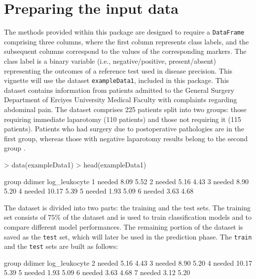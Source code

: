 \documentclass[10pt]{article}
\newcommand{\Rclass}[1]{\texttt{#1}}
\begin{document}
\section{Preparing the input data}
The methods provided within this package are designed to require a \Rclass{DataFrame} comprising three columns, where the first column represents class labels, and the subsequent columns correspond to the values of the corresponding markers. The class label is a binary variable (i.e., negative/positive, present/absent) representing the outcomes of a reference test used in disease precision. 
This vignette will use the dataset \texttt{exampleData1}, included in this package. This dataset contains information from patients admitted to the General Surgery Department of Erciyes University Medical Faculty with complaints regarding abdominal pain. The dataset comprises 225 patients split into two groups: those requiring immediate laparotomy (110 patients) and those not requiring it (115 patients). Patients who had surgery due to postoperative pathologies are in the first group, whereas those with negative laparotomy results belong to the second group \citep{akyildiz2010value}. 
\begin{Schunk}
\begin{Sinput}
> data(exampleData1)
> head(exampleData1)
\end{Sinput}
\begin{Soutput}
   group ddimer log_leukocyte
1 needed   8.09          5.52
2 needed   5.16          4.43
3 needed   8.90          5.20
4 needed  10.17          5.39
5 needed   1.93          5.09
6 needed   3.63          4.68
\end{Soutput}
\end{Schunk}
The dataset is divided into two parts: the training and the test sets. The training set consists of $75\%$ of the dataset and is used to train classification models and to compare different model performances. The remaining portion of the dataset is saved as the \texttt{test} set, which will later be used in the prediction phase.
The \texttt{train} and the \texttt{test} sets are built as follows:
\begin{Schunk}
\begin{Soutput}
   group ddimer log_leukocyte
2 needed   5.16          4.43
3 needed   8.90          5.20
4 needed  10.17          5.39
5 needed   1.93          5.09
6 needed   3.63          4.68
7 needed   3.12          5.20
\end{Soutput}
\end{Schunk}
\end{document}
